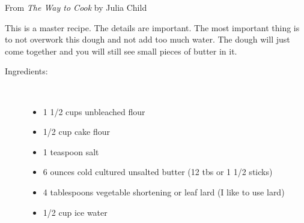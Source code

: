 \documentclass[11pt,letterpaper]{article}
\begin{document}


\begin{flushright}
From {\it The Way to Cook} by Julia Child
\end{flushright}

This is a master recipe. The details are important. The most important thing is to not overwork this dough and not add too much water. The dough will just come together and you will still see small pieces of butter in it.
 
\begin{description}

\item[Ingredients:]\ \\
	\begin{itemize}
	\item 1 1/2	cups unbleached flour
	\item 1/2	cup cake flour
	\item 1	teaspoon salt
	\item 6	ounces cold cultured unsalted butter  (12 tbs or 1 1/2 sticks)
	\item 4	tablespoons vegetable shortening or leaf lard (I like to use lard)
	\item 1/2	cup ice water
	\end{itemize}


\end{description}
\end{document}
